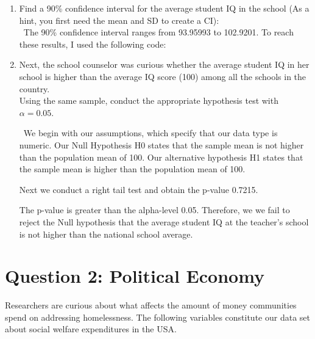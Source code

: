 \documentclass[12pt,letterpaper]{article}
\begin{document}
\begin{enumerate}
	\item Find a 90\% confidence interval for the average student IQ in the school (As a hint, you first need the mean and SD to create a CI):\\
	
	\ The 90\% confidence interval ranges from 93.95993 to 102.9201. To reach these results, I used the following code:
	
	  
	
	\item Next, the school counselor was curious  whether  the average student IQ in her school is higher than the average IQ score (100) among all the schools in the country.\\ 
	
	\noindent Using the same sample, conduct the appropriate hypothesis test with $\alpha=0.05$.
	
	\vspace{1cm}
	
		\ We begin with our assumptions, which specify that our data type is numeric. Our Null Hypothesis H0 states that the sample mean is not higher than the population mean of 100. Our alternative hypothesis H1 states that the sample mean is higher than the population mean of 100. 
	
	  
	
	Next we conduct a right tail test and obtain the p-value 0.7215. 
	
	  
	
	The p-value is greater than the alpha-level 0.05. Therefore, we we fail to reject the Null hypothesis that the average student IQ at the teacher's school is not higher than the national school average.
	
		
	
\end{enumerate}

\newpage

	\section*{Question 2: Political Economy}

\noindent Researchers are curious about what affects the amount of money communities spend on addressing homelessness. The following variables constitute our data set about social welfare expenditures in the USA. \\
\vspace{.5cm}
\end{document}
